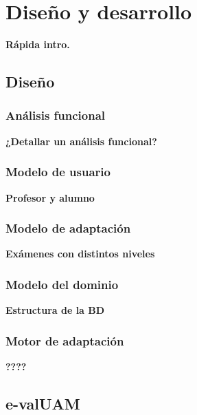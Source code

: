 \chapter{Diseño y desarrollo\label{sec:disenhoYDesarrollo}}

\textbf{Rápida intro.}

\section{Diseño}

\subsection{Análisis funcional}

\textbf{¿Detallar un análisis funcional?}

\subsection{Modelo de usuario}

\textbf{Profesor y alumno}

\subsection{Modelo de adaptación}

\textbf{Exámenes con distintos niveles}

\subsection{Modelo del dominio}

\textbf{Estructura de la BD}

\subsection{Motor de adaptación}

\textbf{????}

\section{e-valUAM}
